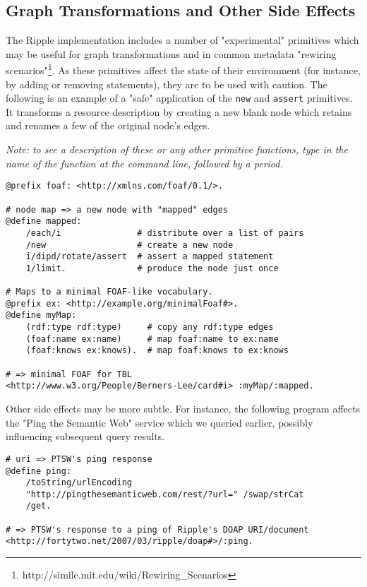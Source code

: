 \documentclass[runningheads]{llncs}
\begin{document}
\subsection{Graph Transformations and Other Side Effects}
The Ripple implementation includes a number of "experimental" primitives which may be useful for graph transformations and in common metadata "rewiring scenarios"\footnote{http://simile.mit.edu/wiki/Rewiring\_Scenarios}.  As these primitives affect the state of their environment (for instance, by adding or removing statements), they are to be used with caution.  The following is an example of a "safe" application of the \texttt{new} and \texttt{assert} primitives.  It transforms a resource description by creating a new blank node which retains and renames a few of the original node's edges.

\textit{Note: to see a description of these or any other primitive functions, type in the name of the function at the command line, followed by a period.}
\begin{verbatim}
@prefix foaf: <http://xmlns.com/foaf/0.1/>.

# node map => a new node with "mapped" edges
@define mapped:
    /each/i               # distribute over a list of pairs
    /new                  # create a new node
    i/dipd/rotate/assert  # assert a mapped statement
    1/limit.              # produce the node just once

# Maps to a minimal FOAF-like vocabulary.
@prefix ex: <http://example.org/minimalFoaf#>.
@define myMap:
    (rdf:type rdf:type)     # copy any rdf:type edges
    (foaf:name ex:name)     # map foaf:name to ex:name
    (foaf:knows ex:knows).  # map foaf:knows to ex:knows

# => minimal FOAF for TBL
<http://www.w3.org/People/Berners-Lee/card#i> :myMap/:mapped.
\end{verbatim}

Other side effects may be more subtle.  For instance, the following program affects the "Ping the Semantic Web" service which we queried earlier, possibly influencing subsequent query results.
\begin{verbatim}
# uri => PTSW's ping response
@define ping:
    /toString/urlEncoding
    "http://pingthesemanticweb.com/rest/?url=" /swap/strCat
    /get.

# => PTSW's response to a ping of Ripple's DOAP URI/document
<http://fortytwo.net/2007/03/ripple/doap#>/:ping.
\end{verbatim}
\end{document}
